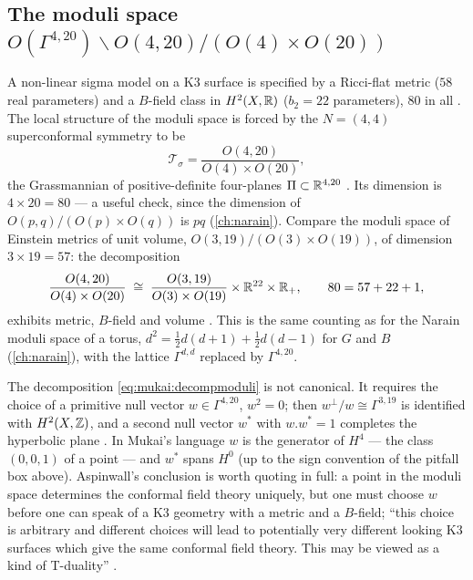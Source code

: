 \subsection{The moduli space \texorpdfstring{$O(\Gamma^{4,20})\backslash O(4,20)/(O(4)\times O(20))$}{of sigma models}}
A non-linear sigma model on a K3 surface is specified by a Ricci-flat metric ($58$ real
parameters) and a $B$-field class in $H^2(X,\mathbb{R})$ ($b_2=22$ parameters), $80$ in all
. The local structure of the moduli space is forced by
the $N=(4,4)$ superconformal symmetry to be
\begin{equation}\label{eq:mukai:teich}
  \mathcal T_\sigma=\frac{O(4,20)}{O(4)\times O(20)},
\end{equation}
the Grassmannian of positive-definite four-planes $\Pi\subset\mathbb{R}^{4,20}$
. Its dimension is
$4\times20=80$ --- a useful check, since the dimension of $O(p,q)/(O(p)\times O(q))$ is $pq$
(\cref{ch:narain}). Compare the moduli space of Einstein metrics of unit volume,
$O(3,19)/(O(3)\times O(19))$, of dimension $3\times19=57$: the decomposition
\begin{equation}\label{eq:mukai:decompmoduli}
  \frac{O(4,20)}{O(4)\times O(20)}\;\cong\;\frac{O(3,19)}{O(3)\times O(19)}\times\mathbb{R}^{22}\times\mathbb{R}_+,
  \qquad 80=57+22+1,
\end{equation}
exhibits metric, $B$-field and volume . This is the
same counting as for the Narain moduli space of a torus, $d^2=\frac12d(d+1)+\frac12d(d-1)$ for
$G$ and $B$ (\cref{ch:narain}), with the lattice $\Gamma^{d,d}$ replaced by $\Gamma^{4,20}$.

The decomposition \eqref{eq:mukai:decompmoduli} is not canonical. It requires the choice of a
primitive null vector $w\in\Gamma^{4,20}$, $w^2=0$; then $w^\perp/w\cong\Gamma^{3,19}$ is
identified with $H^2(X,\mathbb{Z})$, and a second null vector $w^*$ with $w.w^*=1$ completes the
hyperbolic plane . In Mukai's language $w$ is the generator of
$H^4$ --- the class $(0,0,1)$ of a point --- and $w^*$ spans $H^0$ (up to the sign convention of
the pitfall box above). Aspinwall's conclusion is worth quoting in full: a point in the moduli
space determines the conformal field theory uniquely, but one must choose $w$ before one can
speak of a K3 geometry with a metric and a $B$-field; ``this choice is arbitrary and different
choices will lead to potentially very different looking K3 surfaces which give the same
conformal field theory. This may be viewed as a kind of T-duality''
.

